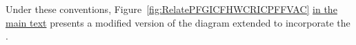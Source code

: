\documentclass[\econtexRoot/BufferStockTheory]{subfiles}
\begin{document}
Under these conventions, Figure~\ref{fig:RelatePFGICFHWCRICPFFVAC} \hyperlink{RelatePFGICFHWCRICPFFVAC}{in the main text} presents a modified version of the diagram extended to incorporate the {\PFFVAC}.

  
\end{document}
